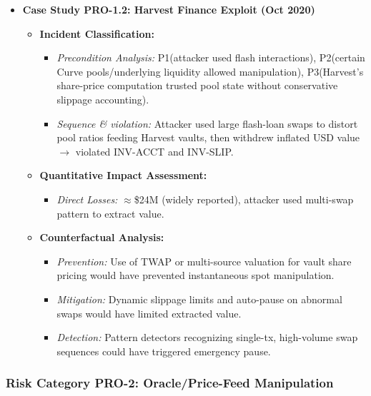 \begin{itemize}
\begin{itemize}
\begin{itemize}
            \end{itemize}
    \end{itemize}
        \item \textbf{Case Study PRO-1.2: Harvest Finance Exploit (Oct 2020)}
    \begin{itemize}
        \item \textbf{Incident Classification:}
            \begin{itemize}
                \item \textit{Precondition Analysis:} P1\checkmark (attacker used flash interactions), P2\checkmark (certain Curve pools/underlying liquidity allowed manipulation), P3\checkmark (Harvest's share-price computation trusted pool state without conservative slippage accounting). \cite{harvest2021, khatri2020harvest}
                \item \textit{Sequence \& violation:} Attacker used large flash-loan swaps to distort pool ratios feeding Harvest vaults, then withdrew inflated USD value $\rightarrow$ violated INV-ACCT and INV-SLIP.
            \end{itemize}
        \item \textbf{Quantitative Impact Assessment:}
            \begin{itemize}
                \item \textit{Direct Losses:} $\approx$\$24M (widely reported), attacker used multi-swap pattern to extract value. \cite{khatri2020harvest, thompson2020harvest}
            \end{itemize}
        \item \textbf{Counterfactual Analysis:}
            \begin{itemize}
                \item \textit{Prevention:} Use of TWAP or multi-source valuation for vault share pricing would have prevented instantaneous spot manipulation. \cite{werner2022sok}
                \item \textit{Mitigation:} Dynamic slippage limits and auto-pause on abnormal swaps would have limited extracted value.
                \item \textit{Detection:} Pattern detectors recognizing single-tx, high-volume swap sequences could have triggered emergency pause.
            \end{itemize}
    \end{itemize}
\end{itemize}


\subsubsection{Risk Category PRO-2: Oracle/Price-Feed Manipulation}

